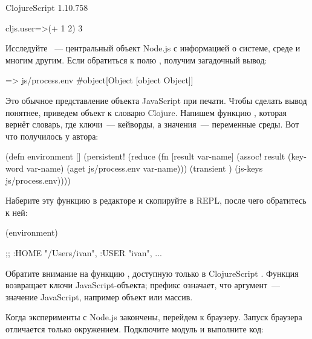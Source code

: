 \begin{english}
  \begin{text}
ClojureScript 1.10.758

cljs.user=>(+ 1 2)
3
  \end{text}
\end{english}


Исследуйте ~--- центральный объект Node.js с информацией о системе, среде и многим другим. Если обратиться к полю , получим загадочный вывод:

\begin{english}
  \begin{clojure}
=> js/process.env
#object[Object [object Object]]
  \end{clojure}
\end{english}

Это обычное представление объекта JavaScript при печати. Чтобы сделать вывод понятнее, приведем объект к словарю Clojure. Напишем функцию , которая вернёт словарь, где ключи~--- кейворды, а значения~--- переменные среды. Вот что получилось у автора:

\begin{english}
  \begin{clojure/lines}
(defn environment []
  (persistent!
   (reduce
    (fn [result var-name]
      (assoc! result
              (keyword var-name)
              (aget js/process.env var-name)))
    (transient {})
    (js-keys js/process.env))))
  \end{clojure/lines}
\end{english}

Наберите эту функцию в редакторе и скопируйте в REPL, после чего обратитесь к ней:

\begin{english}
  \begin{clojure}
(environment)

;; {:HOME "/Users/ivan", :USER "ivan", ...}
  \end{clojure}
\end{english}

Обратите внимание на функцию , доступную только в ClojureScript . Функция возвращает ключи JavaScript-объекта; префикс  означает, что аргумент~--- значение JavaScript, например объект или массив.


Когда эксперименты с Node.js закончены, перейдем к браузеру. Запуск браузера отличается только окружением. Подключите модуль  и выполните код:

